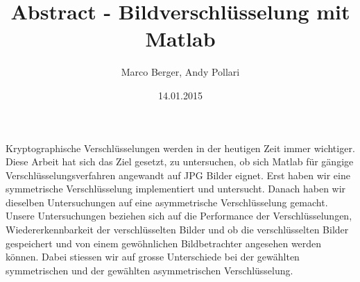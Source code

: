 \documentclass[paper=a4,fontsize=12pt]{scrartcl}
\begin{document}
\title{Abstract - Bildverschlüsselung mit Matlab}
\author{Marco Berger, Andy Pollari}
\date{14.01.2015}
\maketitle
Kryptographische Verschlüsselungen werden in der heutigen Zeit immer wichtiger.
Diese Arbeit hat sich das Ziel gesetzt, zu untersuchen, ob sich Matlab für gängige Verschlüsselungsverfahren 
angewandt auf JPG Bilder eignet.
Erst haben wir eine symmetrische Verschlüsselung implementiert und untersucht. 
Danach haben wir dieselben Untersuchungen auf eine asymmetrische Verschlüsselung gemacht.
Unsere Untersuchungen beziehen sich auf die Performance der Verschlüsselungen, Wiedererkennbarkeit der verschlüsselten Bilder
und ob die verschlüsselten Bilder gespeichert und von einem gewöhnlichen Bildbetrachter angesehen werden können.
Dabei stiessen wir auf grosse Unterschiede bei der gewählten symmetrischen und der gewählten asymmetrischen Verschlüsselung.
\newpage
\end{document}

